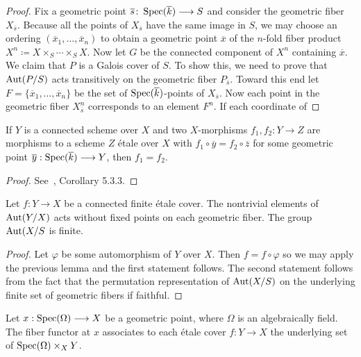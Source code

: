 \begin{proof}
	Fix a geometric point $\overline{s} \colon \operatorname{Spec}(\overline{k}) \longrightarrow S$ and consider the geometric fiber $X_{\overline{s}}$. Because all the points of $X_{\overline{s}}$ have the same image in $S$, we may choose an ordering $(\overline{x}_1, \dots, \overline{x}_n)$ to obtain a geometric point $\overline{x}$ of the $n$-fold fiber product $X^n \coloneqq X \times_S \cdots \times_S X$. Now let $G$ be the connected component of $X^n$ containing $\overline{x}$. We claim that $P$ is a Galois cover of $S$. To show this, we need to prove that $\operatorname{Aut}(P/S)$ acts transitively on the geometric fiber $P_{\overline{s}}$. Toward this end let $F = \{\overline{x}_1, \dots, \overline{x}_n\}$ be the set of $\operatorname{Spec}(\overline{k})$-points of $X_{\overline{s}}$. Now each point in the geometric fiber $X^n_{\overline{s}}$ corresponds to an element $F^n$. If each coordinate of
\end{proof}

\begin{lemma} \label{lemma:rigidity}
	If $Y$ is a connected scheme over $X$ and two $X$-morphisms $f_1, f_2 \colon Y \to Z$ are morphisms to a scheme $Z$ \'etale over $X$ with $f_1 \circ \overline{y} = f_2 \circ \overline{z}$ for some geometric point $\overline{y}: \operatorname{Spec}(\overline{k}) \longrightarrow Y$, then $f_1 = f_2$.
\end{lemma}

\begin{proof}
	See~\cite{Szamuely}, Corollary 5.3.3.
\end{proof}

\begin{corollary}
	Let $f \colon Y \to X$ be a connected finite \'etale cover. The nontrivial elements of  $\operatorname{Aut}(Y/X)$ acts without fixed points on each geometric fiber. The group $\operatorname{Aut}(X/S$ is finite.
\end{corollary}

\begin{proof}
	Let $\varphi$ be some automorphism of $Y$ over $X$. Then $f = f \circ \varphi$ so we may apply the previous lemma and the first statement follows. The second statement follows from the fact that the permutation representation of $\operatorname{Aut}(X/S)$ on the underlying finite set of geometric fibers if faithful.
\end{proof}

\begin{definition}
	Let $x: \operatorname{Spec}(\Omega) \longrightarrow X$ be a geometric point, where $\Omega$ is an algebraically field. The fiber functor at $x$ associates to each \'etale cover $f: Y \to X$ the underlying set of $\operatorname{Spec}(\Omega) \times_X Y$.
\end{definition}

